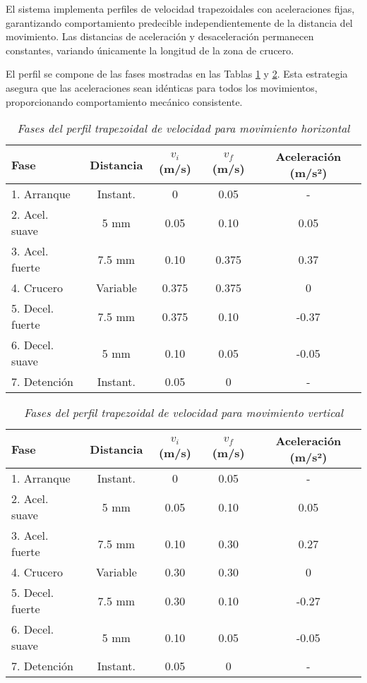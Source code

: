 El sistema implementa perfiles de velocidad trapezoidales con aceleraciones fijas, garantizando comportamiento predecible independientemente de la distancia del movimiento. Las distancias de aceleración y desaceleración permanecen constantes, variando únicamente la longitud de la zona de crucero.

El perfil se compone de las fases mostradas en las Tablas \ref{tab:perfil_horizontal} y \ref{tab:perfil_vertical}. Esta estrategia asegura que las aceleraciones sean idénticas para todos los movimientos, proporcionando comportamiento mecánico consistente.

\begin{table}[H]
\centering
\small
\begin{tabular}{|l|c|c|c|c|}
\hline
\textbf{Fase} & \textbf{Distancia} & \textbf{$v_i$ (m/s)} & \textbf{$v_f$ (m/s)} & \textbf{Aceleración (m/s²)} \\
\hline
1. Arranque & Instant. & 0 & 0.05 & - \\
\hline
2. Acel. suave & 5 mm & 0.05 & 0.10 & 0.05 \\
\hline
3. Acel. fuerte & 7.5 mm & 0.10 & 0.375 & 0.37 \\
\hline
4. Crucero & Variable & 0.375 & 0.375 & 0 \\
\hline
5. Decel. fuerte & 7.5 mm & 0.375 & 0.10 & -0.37 \\
\hline
6. Decel. suave & 5 mm & 0.10 & 0.05 & -0.05 \\
\hline
7. Detención & Instant. & 0.05 & 0 & - \\
\hline
\end{tabular}
\caption{\textit{Fases del perfil trapezoidal de velocidad para movimiento horizontal}}
\label{tab:perfil_horizontal}
\end{table}

\begin{table}[H]
\centering
\small
\begin{tabular}{|l|c|c|c|c|}
\hline
\textbf{Fase} & \textbf{Distancia} & \textbf{$v_i$ (m/s)} & \textbf{$v_f$ (m/s)} & \textbf{Aceleración (m/s²)} \\
\hline
1. Arranque & Instant. & 0 & 0.05 & - \\
\hline
2. Acel. suave & 5 mm & 0.05 & 0.10 & 0.05 \\
\hline
3. Acel. fuerte & 7.5 mm & 0.10 & 0.30 & 0.27 \\
\hline
4. Crucero & Variable & 0.30 & 0.30 & 0 \\
\hline
5. Decel. fuerte & 7.5 mm & 0.30 & 0.10 & -0.27 \\
\hline
6. Decel. suave & 5 mm & 0.10 & 0.05 & -0.05 \\
\hline
7. Detención & Instant. & 0.05 & 0 & - \\
\hline
\end{tabular}
\caption{\textit{Fases del perfil trapezoidal de velocidad para movimiento vertical}}
\label{tab:perfil_vertical}
\end{table}

